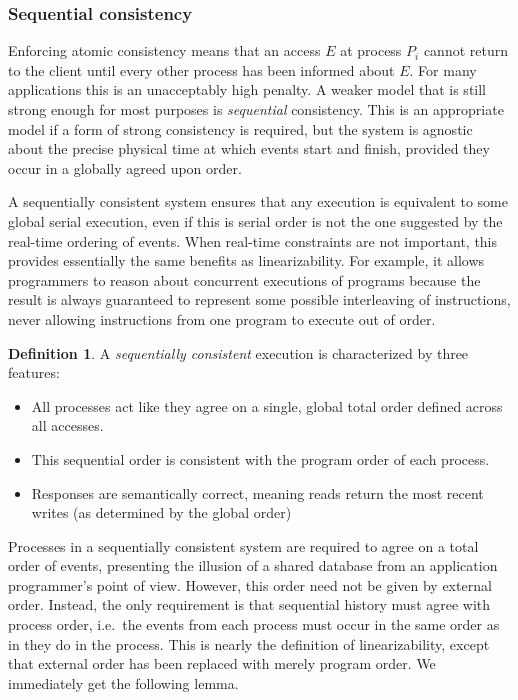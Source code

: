 \documentclass[]             %
{NASA}                       %
\theoremstyle{definition}
\newtheorem{definition}{Definition}[section]
\begin{document}
\hypertarget{sequential-consistency}{%
\subsubsection{Sequential consistency}\label{sequential-consistency}}

Enforcing atomic consistency means that an access \(E\) at process
\(P_i\) cannot return to the client until every other process has been
informed about \(E\). For many applications this is an unacceptably high
penalty. A weaker model that is still strong enough for most purposes is
\emph{sequential} consistency. This is an appropriate model if a form of
strong consistency is required, but the system is agnostic about the
precise physical time at which events start and finish, provided they
occur in a globally agreed upon order.

A sequentially consistent system ensures that any execution is
equivalent to some global serial execution, even if this is serial order
is not the one suggested by the real-time ordering of events. When
real-time constraints are not important, this provides essentially the
same benefits as linearizability. For example, it allows programmers to
reason about concurrent executions of programs because the result is
always guaranteed to represent some possible interleaving of
instructions, never allowing instructions from one program to execute
out of order.

\begin{definition}
\label{def:sequentiallyconsistent}
A \emph{sequentially consistent} execution is
characterized by three features:
\begin{itemize}
\item All processes act like they agree on a single, global total order
  defined across all accesses.
\item This sequential order is consistent with the program order of each process.
\item Responses are semantically correct, meaning reads return the most recent writes (as determined by the global order)
\end{itemize}
\end{definition}

Processes in a sequentially consistent system are required to agree on a
total order of events, presenting the illusion of a shared database from
an application programmer's point of view. However, this order need not
be given by external order. Instead, the only requirement is that
sequential history must agree with process order, i.e.~the events from
each process must occur in the same order as in they do in the process.
This is nearly the definition of linearizability, except that external
order has been replaced with merely program order. We immediately get
the following lemma.
\end{document}
